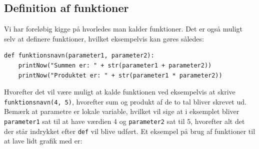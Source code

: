 \documentclass[10pt]{article}
\begin{document}
\subsection{Definition af funktioner}
Vi har foreløbig kigge på hvorledes man kalder funktioner.
Det er også muligt selv at definere funktioner, 
hvilket eksempelvis kan gøres således:
\begin{verbatim}
def funktionsnavn(parameter1, parameter2):
    printNow("Summen er: " + str(parameter1 + parameter2))
    printNow("Produktet er: " + str(parameter1 * parameter2))
\end{verbatim}
Hvorefter det vil være muligt at kalde funktionen ved eksempelvis at skrive \verb|funktionsnavn(4, 5)|, hvorefter sum og produkt af de to tal bliver skrevet ud.
Bemærk at parametre er lokale variable, hvilket vil sige at i eksemplet bliver \verb|parameter1| sat til at have værdien 4 og \verb|parameter2| sat til 5, hvorefter alt det der står indrykket efter \verb|def| vil blive udført.
Et eksempel på brug af funktioner til at lave lidt grafik med er:

\end{document}
